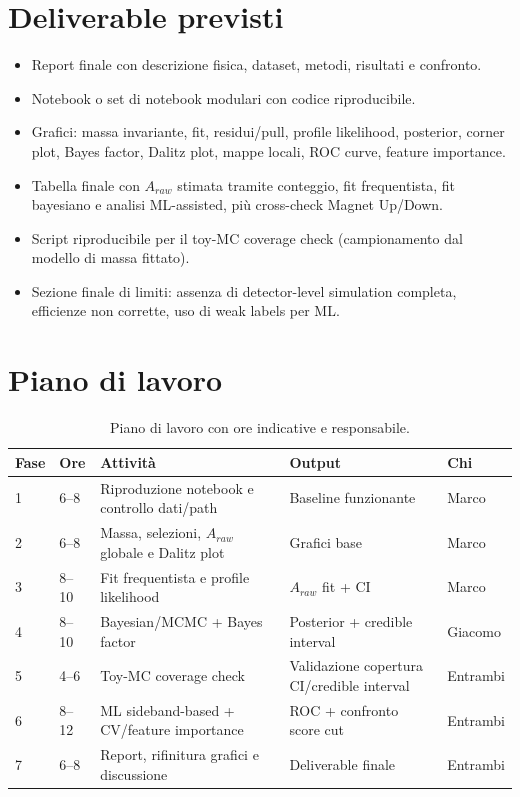 \documentclass[11pt,a4paper]{article}
\begin{document}
\section{Deliverable previsti}
\begin{itemize}[leftmargin=1.4em]
    \item Report finale con descrizione fisica, dataset, metodi, risultati e confronto.
    \item Notebook o set di notebook modulari con codice riproducibile.
    \item Grafici: massa invariante, fit, residui/pull, profile likelihood, posterior, corner plot, Bayes factor, Dalitz plot, mappe locali, ROC curve, feature importance.
    \item Tabella finale con $A_{raw}$ stimata tramite conteggio, fit frequentista, fit bayesiano e analisi ML-assisted, più cross-check Magnet Up/Down.
    \item Script riproducibile per il toy-MC coverage check (campionamento dal modello di massa fittato).
    \item Sezione finale di limiti: assenza di detector-level simulation completa, efficienze non corrette, uso di weak labels per ML.
\end{itemize}

\section{Piano di lavoro}

\begin{table}[h!]
\centering
\begin{tabular}{L{1cm} L{1.6cm} L{4.4cm} L{3.2cm} L{2cm}}
\toprule
\textbf{Fase} & \textbf{Ore} & \textbf{Attività} & \textbf{Output} & \textbf{Chi} \\
 & 6--8 & Riproduzione notebook e controllo dati/path & Baseline funzionante & Marco \\
2 & 6--8 & Massa, selezioni, $A_{raw}$ globale e Dalitz plot & Grafici base & Marco \\
3 & 8--10 & Fit frequentista e profile likelihood & $A_{raw}$ fit + CI & Marco \\
4 & 8--10 & Bayesian/MCMC + Bayes factor & Posterior + credible interval & Giacomo \\
5 & 4--6 & Toy-MC coverage check & Validazione copertura CI/credible interval & Entrambi \\
6 & 8--12 & ML sideband-based + CV/feature importance & ROC + confronto score cut & Entrambi \\
7 & 6--8 & Report, rifinitura grafici e discussione & Deliverable finale & Entrambi \\
\bottomrule
\end{tabular}
\caption{Piano di lavoro con ore indicative e responsabile.}
\end{table}
\end{document}
